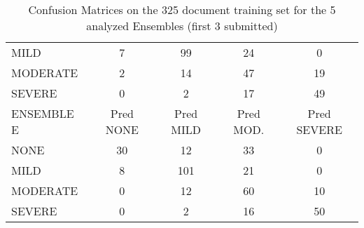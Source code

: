 \begin{table}
\begin{tabular}{|l|c|c|c|c|}
    \textsf{ MILD } & 7 & \cellcolor{gray!15} 99 & 24 & 0 \\ 
    \textsf{ MODERATE } & 2 & 14 & \cellcolor{gray!15} 47 & 19 \\ 
    \textsf{ SEVERE } & 0 & 2 & 17 & \cellcolor{gray!15} 49 \\ 
    \hline
    \textsf{ \cellcolor{gray!15} ENSEMBLE E } & \textsf{ Pred NONE } & \textsf{ Pred MILD } & \textsf{ Pred MOD. } & \textsf{ Pred SEVERE } \\ 
    \hline
    \textsf{ NONE } & \cellcolor{gray!15} 30 & 12 & 33 & 0 \\ 
    \textsf{ MILD } & 8 & \cellcolor{gray!15} 101 & 21 & 0 \\ 
    \textsf{ MODERATE } & 0 & 12 & \cellcolor{gray!15} 60 & 10 \\ 
    \textsf{ SEVERE } & 0 & 2 & 16 & \cellcolor{gray!15} 50 \\ 
    \hline
    \end{tabular}    
    \caption{Confusion Matrices on the 325 document training set for the 5 analyzed Ensembles (first 3 submitted)}
    \label{tab:EnsembleTrainConfusionMatrix}
\end{table}

